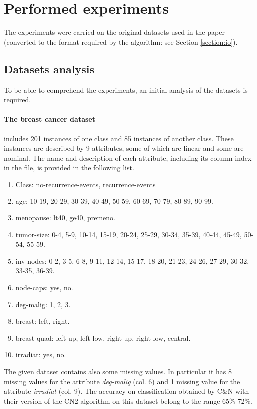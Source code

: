 \documentclass{article}
\begin{document}

\section{Performed experiments}\label{section:tests}
The experiments were carried on the original datasets used in the paper (converted to the format required by the algorithm: see Section \ref{section:io}).

\subsection{Datasets analysis}
To be able to comprehend the experiments, an initial analysis of the datasets is required.

\paragraph{The breast cancer dataset} includes 201 instances of one class and 85 instances of another class. These instances are described by 9 attributes, some of which are linear and some are nominal. The name and description of each attribute, including its column index in the file, is provided in the following list.
\begin{enumerate}\addtocounter{enumi}{-1}
    \item Class: no-recurrence-events, recurrence-events
    \item age: 10-19, 20-29, 30-39, 40-49, 50-59, 60-69, 70-79, 80-89, 90-99.
    \item menopause: lt40, ge40, premeno.
    \item tumor-size: 0-4, 5-9, 10-14, 15-19, 20-24, 25-29, 30-34, 35-39, 40-44, 45-49, 50-54, 55-59.
    \item  inv-nodes: 0-2, 3-5, 6-8, 9-11, 12-14, 15-17, 18-20, 21-23, 24-26, 27-29, 30-32, 33-35, 36-39.
    \item node-caps: yes, no.
    \item deg-malig: 1, 2, 3.
    \item breast: left, right.
    \item breast-quad: left-up, left-low, right-up,	right-low, central.
    \item irradiat:	yes, no.
\end{enumerate}
The given dataset contains also some missing values. In particular it has 8 missing values for the attribute \textit{deg-malig} (col. 6) and 1 missing value for the attribute \textit{irradiat} (col. 9).
\vspace{12pt}\newline
The accuracy on classification obtained by C\&N with their version of the CN2 algorithm on this dataset belong to the range 65\%-72\%.
\end{document}
